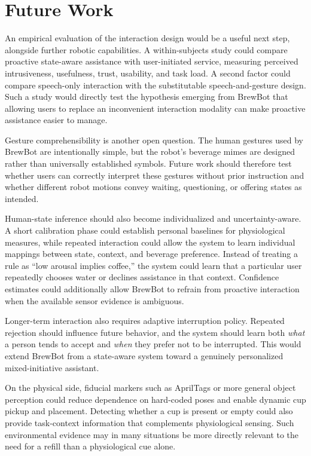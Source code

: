 \section{Future Work}

An empirical evaluation of the interaction design would be a useful next step, 
alongside further robotic capabilities. A within-subjects study could compare 
proactive state-aware assistance with user-initiated service, measuring 
perceived intrusiveness, usefulness, trust, usability, and task load. 
A second factor could compare speech-only interaction with the substitutable 
speech-and-gesture design. Such a study would directly test the hypothesis 
emerging from BrewBot that allowing users to replace an inconvenient interaction 
modality can make proactive assistance easier to manage.

Gesture comprehensibility is another open question. The human gestures used by
BrewBot are intentionally simple, but the robot's beverage mimes are designed
rather than universally established symbols. Future work should therefore test
whether users can correctly interpret these gestures without prior instruction
and whether different robot motions convey waiting, questioning, or offering
states as intended.

Human-state inference should also become individualized and uncertainty-aware. A
short calibration phase could establish personal baselines for physiological
measures, while repeated interaction could allow the system to learn individual
mappings between state, context, and beverage preference. Instead of treating a
rule as ``low arousal implies coffee,'' the system could learn that a particular
user repeatedly chooses water or declines assistance in that context. Confidence
estimates could additionally allow BrewBot to refrain from proactive interaction
when the available sensor evidence is ambiguous.

Longer-term interaction also requires adaptive interruption policy. Repeated
rejection should influence future behavior, and the system should learn both
\emph{what} a person tends to accept and \emph{when} they prefer not to be
interrupted. This would extend BrewBot from a state-aware system toward a
genuinely personalized mixed-initiative assistant.

On the physical side, fiducial markers such as AprilTags
\cite{olson2011apriltag} or more general object perception could reduce
dependence on hard-coded poses and enable dynamic cup pickup and placement.
Detecting whether a cup is present or empty could also provide task-context
information that complements physiological sensing. Such environmental evidence
may in many situations be more directly relevant to the need for a refill than a
physiological cue alone.

